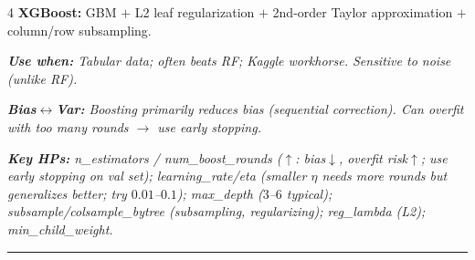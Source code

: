 \documentclass[6.5pt,landscape]{article}
\newcommand{\sectionrule}{\vspace{-1pt}\par\noindent\rule{\columnwidth}{0.4pt}\par\vspace{-2pt}}
\newcommand{\use}[1]{\textit{\textbf{Use when:} #1}}
\newcommand{\bv}[1]{\textit{\textbf{Bias$\leftrightarrow$Var:} #1}}
\newcommand{\hp}[1]{\textit{\textbf{Key HPs:} #1}}
\begin{document}
\begin{multicols*}{4}
\textbf{XGBoost:} GBM $+$ L2 leaf regularization $+$ 2nd-order Taylor approximation $+$ column/row subsampling.\par
\use{Tabular data; often beats RF; Kaggle workhorse. Sensitive to noise (unlike RF).}\par
\bv{Boosting primarily reduces bias (sequential correction). Can overfit with too many rounds $\to$ use early stopping.}\par
\hp{n\_estimators / num\_boost\_rounds ($\uparrow$: bias$\downarrow$, overfit risk$\uparrow$; use early stopping on val set); learning\_rate/eta (smaller $\eta$ needs more rounds but generalizes better; try $0.01$--$0.1$); max\_depth ($3$--$6$ typical); subsample/colsample\_bytree (subsampling, regularizing); reg\_lambda (L2); min\_child\_weight.}\par
\sectionrule

\end{multicols*}
\end{document}
